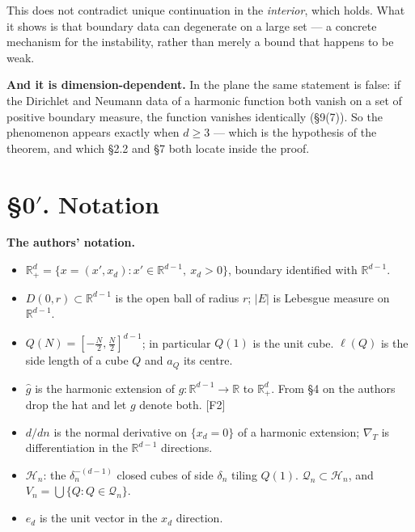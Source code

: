 \documentclass[11pt,reqno]{amsart}
\theoremstyle{plain}
\theoremstyle{definition}
\theoremstyle{plain}
\theoremstyle{definition}
\theoremstyle{remark}
\newcommand{\Rd}{\mathbb{R}^d_+}
\newcommand{\Rdm}{\mathbb{R}^{d-1}}
\newcommand{\he}[1]{\widehat{#1}}
\newcommand{\Ledger}[1]{{\scriptsize\textsf{[#1]}}}
\begin{document}
This does not contradict unique continuation in the \emph{interior}, which holds. What
it shows is that boundary data can degenerate on a large set --- a concrete mechanism
for the instability, rather than merely a bound that happens to be weak.

\medskip
\noindent\textbf{And it is dimension-dependent.} In the plane the same statement is
false: if the Dirichlet and Neumann data of a harmonic function both vanish on a set
of positive boundary measure, the function vanishes identically (\S9(7)). So the
phenomenon appears exactly when $d\ge3$ --- which is the hypothesis of the theorem,
and which \S2.2 and \S7 both locate inside the proof.

\section*{\S0$'$. Notation}

\noindent\textbf{The authors' notation.}
\begin{itemize}[leftmargin=1.6em,itemsep=1pt]
\item $\Rd=\{x=(x',x_d):x'\in\Rdm,\ x_d>0\}$, boundary identified with $\Rdm$.
\item $D(0,r)\subset\Rdm$ is the open ball of radius $r$; $|E|$ is Lebesgue measure
  on $\Rdm$.
\item $Q(N)=[-\tfrac N2,\tfrac N2]^{d-1}$; in particular $Q(1)$ is the unit cube.
  $\ell(Q)$ is the side length of a cube $Q$ and $a_Q$ its centre.
\item $\he g$ is the harmonic extension of $g:\Rdm\to\mathbb R$ to $\Rd$. From \S4
  on the authors drop the hat and let $g$ denote both. \Ledger{F2}
\item $d/dn$ is the normal derivative on $\{x_d=0\}$ of a harmonic extension;
  $\nabla_T$ is differentiation in the $\Rdm$ directions.
\item $\mathcal H_n$: the $\delta_n^{-(d-1)}$ closed cubes of side $\delta_n$
  tiling $Q(1)$. $\mathcal Q_n\subset\mathcal H_n$, and
  $V_n=\bigcup\{Q:Q\in\mathcal Q_n\}$.
\item $e_d$ is the unit vector in the $x_d$ direction.
\end{itemize}
\end{document}

